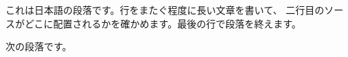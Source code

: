 \documentclass[uplatex,dvipdfmx]{jsarticle}
\begin{document}
これは日本語の段落です。行をまたぐ程度に長い文章を書いて、
二行目のソースがどこに配置されるかを確かめます。最後の行で段落を終えます。\par
次の段落です。
\end{document}
